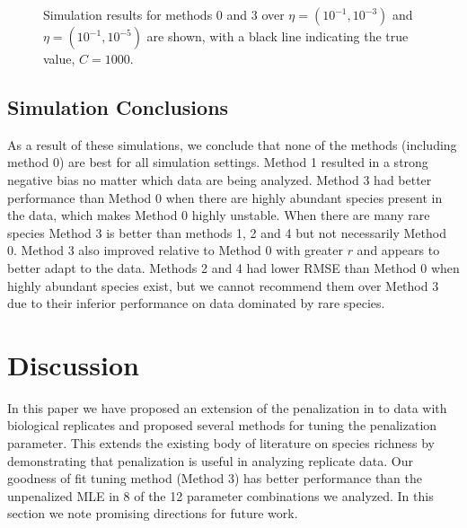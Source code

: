 \documentclass[oupdraft]{bio}
\begin{document}
\begin{figure}[t]
\caption{Simulation results for methods 0 and 3 over $\eta = (10^{-1}, 10^{-3})$ and $\eta = (10^{-1}, 10^{-5})$ are shown, with a black line indicating the true value, $C = 1000$.
\label{fig:tuning_sim_2}}
\centering{}
\end{figure}

\subsection{Simulation Conclusions}

As a result of these simulations, we conclude that none of the methods (including method 0) are best for all simulation settings.  Method 1 resulted in a strong negative bias no matter which data are being analyzed.  Method 3 had better performance than Method 0 when there are highly abundant species present in the data, which makes Method 0 highly unstable.  When there are many rare species Method 3 is better than methods 1, 2 and 4 but not necessarily Method 0.  Method 3 also improved relative to Method 0 with greater $r$ and appears to better adapt to the data.  Methods 2 and 4 had lower RMSE than Method 0 when highly abundant species exist, but we cannot recommend them over Method 3 due to their inferior performance on data dominated by rare species.

\section{Discussion}
\label{sec:discussion}

In this paper we have proposed an extension of the penalization in \citet{wang_2005} to data with biological replicates and proposed several methods for tuning the penalization parameter.  This extends the existing body of literature on species richness by demonstrating that penalization is useful in analyzing replicate data.  Our goodness of fit tuning method (Method 3) has better performance than the unpenalized MLE in 8 of the 12 parameter combinations we analyzed.  In this section we note promising directions for future work.
\end{document}
